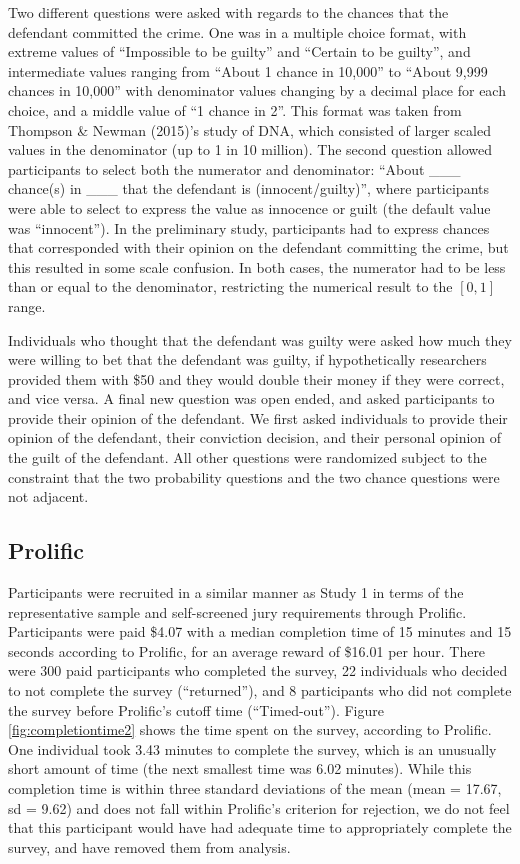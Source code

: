 \documentclass[print]{nuthesis}
\begin{document}
Two different questions were asked with regards to the chances that the defendant committed the crime.
One was in a multiple choice format, with extreme values of ``Impossible to be guilty'' and ``Certain to be guilty'', and intermediate values ranging from ``About 1 chance in 10,000'' to ``About 9,999 chances in 10,000'' with denominator values changing by a decimal place for each choice, and a middle value of ``1 chance in 2''.
This format was taken from Thompson \& Newman (2015)'s study of DNA, which consisted of larger scaled values in the denominator (up to 1 in 10 million).
The second question allowed participants to select both the numerator and denominator: ``About \_\_\_ chance(s) in \_\_\_ that the defendant is (innocent/guilty)'', where participants were able to select to express the value as innocence or guilt (the default value was ``innocent'').
In the preliminary study, participants had to express chances that corresponded with their opinion on the defendant committing the crime, but this resulted in some scale confusion.
In both cases, the numerator had to be less than or equal to the denominator, restricting the numerical result to the \([0,1]\) range.

Individuals who thought that the defendant was guilty were asked how much they were willing to bet that the defendant was guilty, if hypothetically researchers provided them with \$50 and they would double their money if they were correct, and vice versa.
A final new question was open ended, and asked participants to provide their opinion of the defendant.
We first asked individuals to provide their opinion of the defendant, their conviction decision, and their personal opinion of the guilt of the defendant.
All other questions were randomized subject to the constraint that the two probability questions and the two chance questions were not adjacent.

\hypertarget{prolific-1}{%
\subsection{Prolific}\label{prolific-1}}

Participants were recruited in a similar manner as Study 1 in terms of the representative sample and self-screened jury requirements through Prolific.
Participants were paid \$4.07 with a median completion time of 15 minutes and 15 seconds according to Prolific, for an average reward of \$16.01 per hour.
There were 300 paid participants who completed the survey, 22 individuals who decided to not complete the survey (``returned''), and 8 participants who did not complete the survey before Prolific's cutoff time (``Timed-out'').
Figure \ref{fig:completiontime2} shows the time spent on the survey, according to Prolific.
One individual took 3.43 minutes to complete the survey, which is an unusually short amount of time (the next smallest time was 6.02 minutes).
While this completion time is within three standard deviations of the mean (mean = 17.67, sd = 9.62) and does not fall within Prolific's criterion for rejection, we do not feel that this participant would have had adequate time to appropriately complete the survey, and have removed them from analysis.
\end{document}
